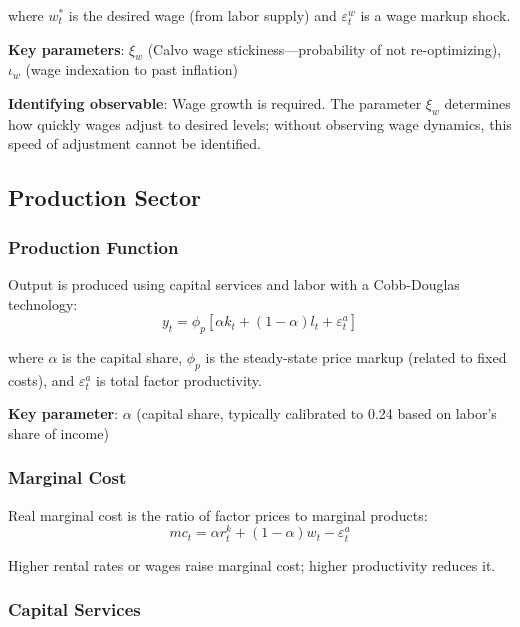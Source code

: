 \documentclass[12pt]{article}
\begin{document}
where $w^*_t$ is the desired wage (from labor supply) and $\varepsilon^w_t$ is a wage markup shock.

\textbf{Key parameters}: $\xi_w$ (Calvo wage stickiness---probability of not re-optimizing), $\iota_w$ (wage indexation to past inflation)

\textbf{Identifying observable}: Wage growth is required. The parameter $\xi_w$ determines how quickly wages adjust to desired levels; without observing wage dynamics, this speed of adjustment cannot be identified.

\subsection{Production Sector}

\subsubsection{Production Function}

Output is produced using capital services and labor with a Cobb-Douglas technology:
\begin{equation}
\boxed{y_t = \phi_p[\alpha k_t + (1-\alpha)l_t + \varepsilon^a_t]}
\label{eq:production}
\end{equation}

where $\alpha$ is the capital share, $\phi_p$ is the steady-state price markup (related to fixed costs), and $\varepsilon^a_t$ is total factor productivity.

\textbf{Key parameter}: $\alpha$ (capital share, typically calibrated to 0.24 based on labor's share of income)

\subsubsection{Marginal Cost}

Real marginal cost is the ratio of factor prices to marginal products:
\begin{equation}
\boxed{mc_t = \alpha r^k_t + (1-\alpha)w_t - \varepsilon^a_t}
\label{eq:mc}
\end{equation}

Higher rental rates or wages raise marginal cost; higher productivity reduces it.

\subsubsection{Capital Services}
\end{document}
